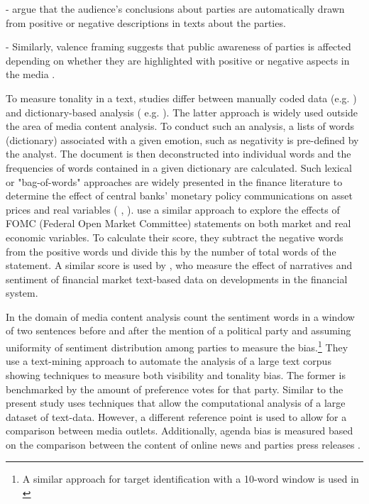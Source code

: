 \documentclass[12pt,a4paper,notitlepage]{article}
\begin{document}
- \citet{druckman_impact_2005} argue that the audience's conclusions about parties are automatically drawn from positive or negative descriptions in texts about the parties. 

- Similarly, valence framing suggests that public awareness of parties is affected depending on whether they are highlighted with positive or negative aspects in the media \citep{de_vreese_valenced_2006, hurtikova_importance_2017}.  

To measure tonality in a text, studies differ between manually coded data (e.g. \citet{eberl_one_2017}) and dictionary-based analysis ( e.g. \citep{junque_de_fortuny_media_2012}). The latter approach is widely used outside the area of media content analysis. To conduct such an analysis, a lists of words (dictionary) associated with a given emotion, such as negativity is pre-defined by the analyst. The document is then deconstructed into individual words and the frequencies of words contained in a given dictionary are calculated. Such lexical or "bag-of-words" approaches are widely presented in the finance literature to determine the effect of central banks' monetary policy communications on asset prices and real variables (\citet{nyman_news_2018} \citet{tetlock_giving_2007}, \citet{tetlock_more_2008}). \citet{hansen_shocking_2016} use a similar approach to explore the effects of FOMC (Federal Open Market Committee) statements on both market and real economic variables. To calculate their score, they subtract the negative words from the positive words und divide this by the number of total words of the statement. A similar score is used by \citet{nyman_news_2018}, who measure the effect of narratives and sentiment of financial market text-based data on developments in the financial system. 

In the domain of media content analysis \citet{junque_de_fortuny_media_2012} count the sentiment words in a window of two sentences before and after the mention of a political party and assuming uniformity of sentiment distribution among parties to measure the bias.\footnote{A similar approach for target identification with a 10-word window is used in \citet{balahur_sentiment_2013}} They use a text-mining approach to automate the analysis of a large text corpus showing techniques to measure both visibility and tonality bias. The former is benchmarked by the amount of preference votes for that party. Similar to \citet{junque_de_fortuny_media_2012} the present study uses techniques that allow the computational analysis of a large dataset of text-data. However, a different reference point is used to allow for a comparison between media outlets. Additionally, agenda bias is measured based on the comparison between the content of online news and parties press releases \citet{eberl_one_2017}.  
\end{document}
